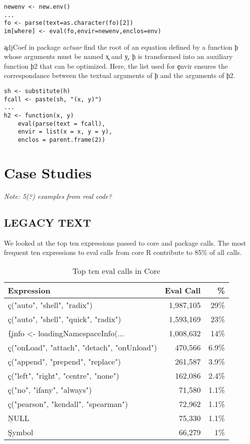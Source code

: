 \documentclass[USenglish,cleveref, autoref, thm-restate]{lipics-v2019}
\newcommand{\NOTE}[1]{{\it Note: #1}\xspace}
\begin{document}
\begin{lstlisting}
newenv <- new.env()
...
fo <- parse(text=as.character(fo)[2])
im[where] <- eval(fo,envir=newenv,enclos=env)
\end{lstlisting}

\c{adjCoef} in package \emph{actuar} find the root of an equation
defined by a function \c{h} whose arguments must be named \c{x} and
\c{y}. \c{h} is transformed into an auxiliary function \c{h2} that can
be optimized. Here, the list used for \c{envir} ensures the
correspondance between the textual arguments of \c{h} and the
arguments of \c{h2}.


\begin{lstlisting}
sh <- substitute(h)
fcall <- paste(sh, "(x, y)")
...
h2 <- function(x, y)
    eval(parse(text = fcall),
    envir = list(x = x, y = y),
    enclos = parent.frame(2))
\end{lstlisting}


\section{Case Studies}

\NOTE{5(?) examples from real code?}

\subsection{LEGACY TEXT}

We looked at the top ten expressions passed to core and package \eval
calls. The most frequent ten expressions to eval calls from core R
contribute to 85\% of all \eval calls.

\begin{table}[!h] \centering
\begin{tabular}{@{}l|rr@{}} \hline
Expression & Eval Call &  \% \\\hline
\c{c("auto", "shell", "radix")} & 1,987,105 & 29\%\\
\c{c("auto", "shell", "quick", "radix")} & 1,593,169  & 23\%\\
\c{\{info <- loadingNamespaceInfo(...} & 1,008,632 &       14\%\\
\c{c("onLoad", "attach", "detach", "onUnload")}   & 470,566 &      6.9\%\\
\c{c("append", "prepend", "replace")} &              261,587&       3.9\% \\
\c{c("left", "right", "centre", "none")} & 162,086     & 2.4\%\\
\c{c("no", "ifany", "always")}   &                71,580 &       1.1\%\\
\c{c("pearson", "kendall", "spearman")}  & 72,962 &      1.1\%\\
\c{NULL}& 75,330  &      1.1\% \\
\c{Symbol}&                 66,279&       1\%\\\hline
\end{tabular}
\caption{Top ten eval calls in Core}\label{B}
\end{table}
\end{document}
